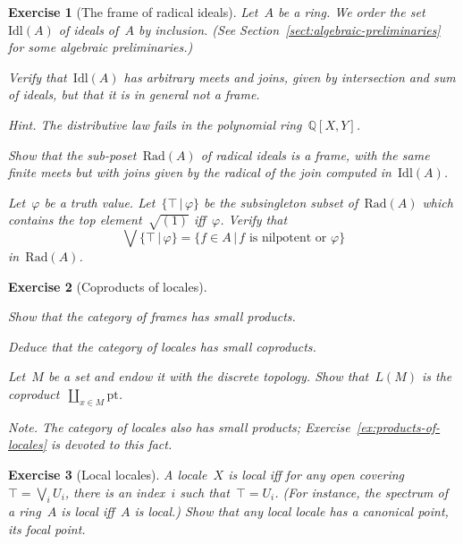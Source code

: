 \documentclass{ws-rv9x6}
\newtheorem{ex}{Exercise}
\newenvironment{exercise}[1]{
  \begin{ex}[#1]
}{\end{ex}}
\newcommand{\QQ}{\mathbb{Q}}
\newcommand{\Rad}{\mathrm{Rad}}
\newcommand{\Idl}{\mathrm{Idl}}
\renewcommand{\_}{\mathpunct{.}}
\newcommand{\?}{\,{:}\,}
\newcommand{\pt}{\mathrm{pt}}
\begin{document}
\begin{exercise}{The frame of radical ideals}%
\label{ex:frame-of-radical-ideals}%
Let~$A$ be a ring. We order the set~$\Idl(A)$ of ideals of~$A$ by inclusion.
(See Section~\ref{sect:algebraic-preliminaries} for some algebraic
preliminaries.)
\begin{alphlist}[(b)]
\item Verify that~$\Idl(A)$ has arbitrary meets and joins, given by
intersection and sum of ideals, but that it is in general not a
frame.\smallskip

{\scriptsize\emph{Hint.} The distributive law fails in the polynomial ring~$\QQ[X,Y]$.\par}
\item Show that the sub-poset~$\Rad(A)$ of radical ideals is a frame, with
the same finite meets but with joins given by the radical of the join computed
in~$\Idl(A)$.
\item\label{item:join-top} Let~$\varphi$ be a truth value. Let~$\{\top\,|\,\varphi\}$ be the
subsingleton subset of~$\Rad(A)$ which contains the top element~$\sqrt{(1)}$
iff~$\varphi$. Verify that
\[ \bigvee\{\top\,|\,\varphi\} = \{ f \in A \,|\, \text{$f$ is nilpotent
or~$\varphi$} \} \]
in~$\Rad(A)$.
\end{alphlist}
\end{exercise}

\begin{exercise}{Coproducts of locales}%
\begin{alphlist}[(c)]
\item Show that the category of frames has small products.
\item Deduce that the category of locales has small coproducts.
\item Let~$M$ be a set and endow it with the discrete topology. Show
that~$L(M)$ is the coproduct~$\coprod_{x \in M} \pt$.
\end{alphlist}
{\scriptsize\emph{Note.} The category of locales also has small products;
Exercise~\ref{ex:products-of-locales} is devoted to this fact.\par}
\end{exercise}

\begin{exercise}{Local locales}%
\label{ex:local-locales}%
A locale~$X$ is \emph{local} iff for any open covering~$\top = \bigvee_i U_i$,
there is an index~$i$ such that~$\top = U_i$. (For instance, the spectrum of a
ring~$A$ is local iff~$A$ is local.)
Show that any local locale has a canonical point, its \emph{focal point}.
\end{exercise}
\end{document}
